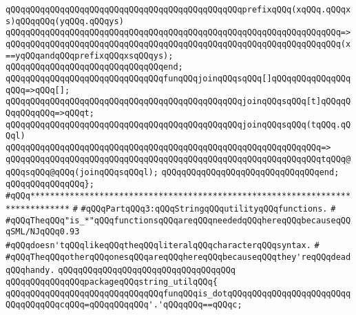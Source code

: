 \verb|qQQqqQQqqQQqqQQqqQQqqQQqqQQqqQQqqQQqqQQqqQQqqQQqprefixqQQq(xqQQq.qQQqxs)qQQqqQQq(yqQQq.qQQqys)|\newline
\verb|qQQqqQQqqQQqqQQqqQQqqQQqqQQqqQQqqQQqqQQqqQQqqQQqqQQqqQQqqQQqqQQqqQQq=>|\newline
\verb|qQQqqQQqqQQqqQQqqQQqqQQqqQQqqQQqqQQqqQQqqQQqqQQqqQQqqQQqqQQqqQQqqQQq(x==yqQQqandqQQqprefixqQQqxsqQQqys);|\newline
\verb|qQQqqQQqqQQqqQQqqQQqqQQqqQQqqQQqend;|\newline
\newline
\verb|qQQqqQQqqQQqqQQqqQQqqQQqqQQqqQQqfunqQQqjoinqQQqsqQQq[]qQQqqQQqqQQqqQQqqQQq=>qQQq[];|\newline
\verb|qQQqqQQqqQQqqQQqqQQqqQQqqQQqqQQqqQQqqQQqqQQqqQQqjoinqQQqsqQQq[t]qQQqqQQqqQQqqQQq=>qQQqt;|\newline
\verb|qQQqqQQqqQQqqQQqqQQqqQQqqQQqqQQqqQQqqQQqqQQqqQQqjoinqQQqsqQQq(tqQQq.qQQql)|\newline
\verb|qQQqqQQqqQQqqQQqqQQqqQQqqQQqqQQqqQQqqQQqqQQqqQQqqQQqqQQqqQQqqQQq=>|\newline
\verb|qQQqqQQqqQQqqQQqqQQqqQQqqQQqqQQqqQQqqQQqqQQqqQQqqQQqqQQqqQQqqQQqtqQQq@qQQqsqQQq@qQQq(joinqQQqsqQQql);|\newline
\verb|qQQqqQQqqQQqqQQqqQQqqQQqqQQqqQQqend;|\newline
\verb|qQQqqQQqqQQqqQQq};|\newline
\newline
\verb|#qQQq******************************************************************************|\newline
\verb|#|\newline
\verb|#qQQqPartqQQq3:qQQqStringqQQqutilityqQQqfunctions.|\newline
\verb|#|\newline
\verb|#qQQqTheqQQq"is_*"qQQqfunctionsqQQqareqQQqneededqQQqhereqQQqbecauseqQQqSML/NJqQQq0.93|\newline
\verb|#qQQqdoesn'tqQQqlikeqQQqtheqQQqliteralqQQqcharacterqQQqsyntax.|\newline
\verb|#|\newline
\verb|#qQQqTheqQQqotherqQQqonesqQQqareqQQqhereqQQqbecauseqQQqthey'reqQQqdeadqQQqhandy.|\newline
\newline
\verb|qQQqqQQqqQQqqQQqqQQqqQQqqQQqqQQqqQQq|\newline
\verb|qQQqqQQqqQQqqQQqpackageqQQqstring_utilqQQq{|\newline
\newline
\verb|qQQqqQQqqQQqqQQqqQQqqQQqqQQqqQQqfunqQQqis_dotqQQqqQQqqQQqqQQqqQQqqQQqqQQqqQQqqQQqcqQQq=qQQqqQQqqQQq'.'qQQqqQQq==qQQqc;|\newline
